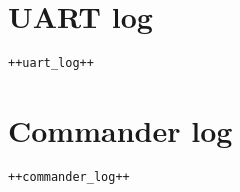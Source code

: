 
\section{UART log}
\begin{verbatim}
++uart_log++
\end{verbatim}

\section{Commander log}
\begin{verbatim}
++commander_log++
\end{verbatim}




